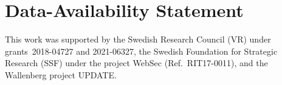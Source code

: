 \documentclass[acmsmall]{acmart}\settopmatter{}
\theoremstyle{definition}
\begin{document}
\section{Data-Availability Statement}


\begin{acks}
  This work was supported by
    the Swedish Research Council (VR)
    under grants~2018-04727 and 2021-06327, the Swedish Foundation for Strategic
    Research (SSF) under the project WebSec (Ref.\ RIT17-0011), and the
    Wallenberg project UPDATE.
\end{acks}


%



\end{document}
